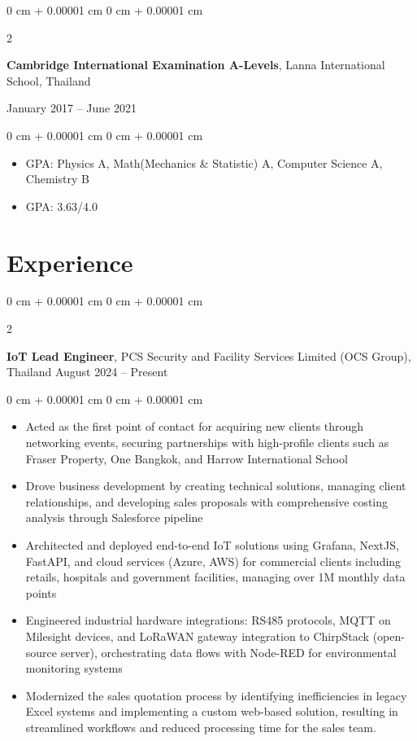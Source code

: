 \documentclass[10pt, letterpaper]{article}
\newenvironment{highlights}{
    \begin{itemize}[
        topsep=0.0 cm,
        parsep=0.0 cm,
        partopsep=0pt,
        itemsep=0pt,
        leftmargin=0 cm + 10pt
    ]
}{
    \end{itemize}
} %
\newenvironment{onecolentry}{
    \begin{adjustwidth}{
        0 cm + 0.00001 cm
    }{
        0 cm + 0.00001 cm
    }
}{
    \end{adjustwidth}
} %
\newenvironment{twocolentry}[2][]{
    \onecolentry
    \def\secondColumn{#2}
    \setcolumnwidth{\fill, 4.5 cm}
    \begin{paracol}{2}
}{
    \switchcolumn \raggedleft \secondColumn
    \end{paracol}
    \endonecolentry
} %
\begin{document}
        \vspace{0.10 cm}
        \begin{twocolentry}{
        January 2017 – June 2021
        }
        \textbf{Cambridge International Examination A-Levels}, Lanna International School, Thailand
        \end{twocolentry}
        \begin{onecolentry}
            \begin{highlights}
                \item GPA: Physics A, Math(Mechanics \& Statistic) A, Computer Science A, Chemistry B 
                \item GPA: 3.63/4.0 %
                
            \end{highlights}
        \end{onecolentry}

    \vspace{0.20 cm}
    
    \section{Experience}
        \begin{twocolentry}{August 2024 – Present}
        \textbf{IoT Lead Engineer}, PCS Security and Facility Services Limited (OCS Group), Thailand\end{twocolentry}
        \vspace{0.1 cm}
        \begin{onecolentry}\begin{highlights}
            \item Acted as the first point of contact for acquiring new clients through networking events, securing partnerships with high-profile clients such as Fraser Property, One Bangkok, and Harrow International School
            \item Drove business development by creating technical solutions, managing client relationships, and developing sales proposals with comprehensive costing analysis through Salesforce pipeline
            \item Architected and deployed end-to-end IoT solutions using Grafana, NextJS, FastAPI, and cloud services (Azure, AWS) for commercial clients including retails, hospitals and government facilities, managing over 1M monthly data points
            \item Engineered industrial hardware integrations: RS485 protocols, MQTT on Milesight devices, and LoRaWAN gateway integration to ChirpStack (open-source server), orchestrating data flows with Node-RED for environmental monitoring systems
            \item Modernized the sales quotation process by identifying inefficiencies in legacy Excel systems and implementing a custom web-based solution, resulting in streamlined workflows and reduced processing time for the sales team.
        \end{highlights}\end{onecolentry}
        
\end{document}
